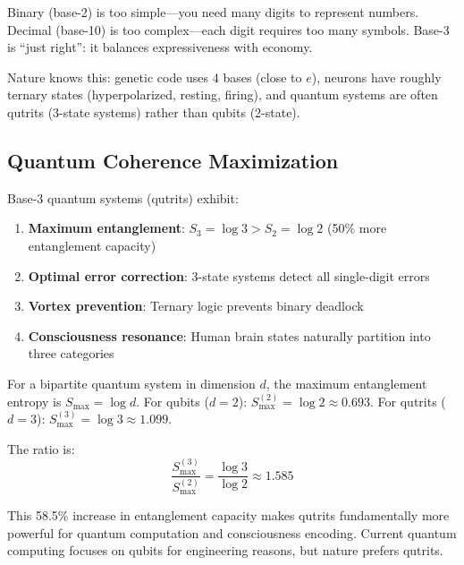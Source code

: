 \begin{intuitive}
Binary (base-2) is too simple---you need many digits to represent numbers. Decimal (base-10) is too complex---each digit requires too many symbols. Base-3 is ``just right'': it balances expressiveness with economy.

Nature knows this: genetic code uses 4 bases (close to $e$), neurons have roughly ternary states (hyperpolarized, resting, firing), and quantum systems are often qutrits (3-state systems) rather than qubits (2-state).
\end{intuitive}

\subsection{Quantum Coherence Maximization}

\begin{thm}\label{thm:ternary-quantum}
Base-3 quantum systems (qutrits) exhibit:
\begin{enumerate}
\item \textbf{Maximum entanglement}: $S_3 = \log 3 > S_2 = \log 2$ (50\% more entanglement capacity)
\item \textbf{Optimal error correction}: 3-state systems detect all single-digit errors
\item \textbf{Vortex prevention}: Ternary logic prevents binary deadlock
\item \textbf{Consciousness resonance}: Human brain states naturally partition into three categories
\end{enumerate}
\end{thm}

\begin{level3}
For a bipartite quantum system in dimension $d$, the maximum entanglement entropy is $S_{\max} = \log d$. For qubits ($d=2$): $S_{\max}^{(2)} = \log 2 \approx 0.693$. For qutrits ($d=3$): $S_{\max}^{(3)} = \log 3 \approx 1.099$.

The ratio is:
\begin{equation}
\frac{S_{\max}^{(3)}}{S_{\max}^{(2)}} = \frac{\log 3}{\log 2} \approx 1.585
\end{equation}

This 58.5\% increase in entanglement capacity makes qutrits fundamentally more powerful for quantum computation and consciousness encoding. Current quantum computing focuses on qubits for engineering reasons, but nature prefers qutrits.
\end{level3}

